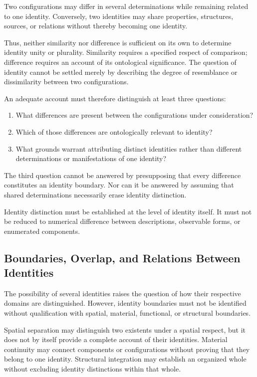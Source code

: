 Two configurations may differ in several determinations
while remaining related to one identity. Conversely,
two identities may share properties, structures, sources,
or relations without thereby becoming one identity.

Thus, neither similarity nor difference is sufficient
on its own to determine identity unity or plurality.
Similarity requires a specified respect of comparison;
difference requires an account of its ontological
significance. The question of identity cannot be settled
merely by describing the degree of resemblance or
dissimilarity between two configurations.

An adequate account must therefore distinguish at least
three questions:

\begin{enumerate}
    \item What differences are present between the
    configurations under consideration?
    \item Which of those differences are ontologically
    relevant to identity?
    \item What grounds warrant attributing distinct
    identities rather than different determinations
    or manifestations of one identity?
\end{enumerate}

The third question cannot be answered by presupposing
that every difference constitutes an identity boundary.
Nor can it be answered by assuming that shared
determinations necessarily erase identity distinction.

Identity distinction must be established at the level
of identity itself. It must not be reduced to numerical
difference between descriptions, observable forms,
or enumerated components.

\subsection{Boundaries, Overlap, and Relations Between Identities}

The possibility of several identities raises the question
of how their respective domains are distinguished.
However, identity boundaries must not be identified
without qualification with spatial, material, functional,
or structural boundaries.

Spatial separation may distinguish two existents under
a spatial respect, but it does not by itself provide
a complete account of their identities. Material continuity
may connect components or configurations without proving
that they belong to one identity. Structural integration
may establish an organized whole without excluding
identity distinctions within that whole.

